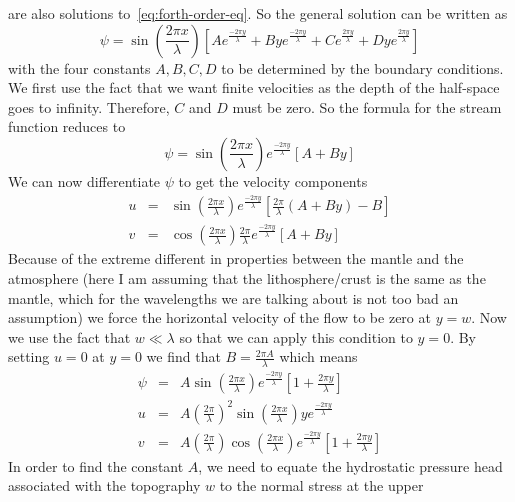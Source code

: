 \documentclass[12pt,twoside]{article}
\begin{document}
are also solutions to~\ref{eq:forth-order-eq}. So the general solution can be
written as
\begin{equation}
\psi = \sin \left (\frac{2 \pi x}{\lambda} \right ) \left [ A e^{\frac{-2 \pi
y}{\lambda}} + By e^{\frac{-2 \pi y}{\lambda}} + C e^{\frac{2 \pi y}{\lambda}}
+ Dy e^{\frac{2 \pi y}{\lambda}} \right ]
\end{equation}
with the four constants $A, B, C, D$ to be determined by the boundary
conditions.  We first use the fact that we want finite velocities as the depth
of the half-space goes to infinity.  Therefore, $C$ and $D$ must be zero.  So
the formula for the stream function reduces to
\begin{equation}
\psi = \sin \left (\frac{2 \pi x}{\lambda} \right ) 
e^{\frac{-2 \pi y}{\lambda}} \left [ A + By \right ]
\end{equation}
We can now differentiate $\psi$ to get the velocity components
\begin{eqnarray}
u & = & \sin \left (\frac{2 \pi x}{\lambda} \right )  
e^{\frac{-2\pi y}{\lambda}}\left [\frac{2\pi}{\lambda}(A + By)-B\right ] \\
v & = & \cos \left (\frac{2 \pi x}{\lambda} \right ) \frac{2 \pi}{\lambda}
e^{\frac{-2 \pi y}{\lambda}} \left [ A + By \right ]
\end{eqnarray}
Because of the extreme different in properties between the mantle and the
atmosphere (here I am assuming that the lithosphere/crust is the same as the
mantle, which for the wavelengths we are talking about is not too bad an
assumption) we force the horizontal velocity of the flow to be zero at $y =
w$.  Now we use the fact that $w \ll \lambda$ so that we can apply this
condition to $y=0$.  By setting $u=0$ at $y=0$ we find that $B = \frac{2\pi
A}{\lambda}$ which means
\begin{eqnarray} 
\psi & = & A \sin \left (\frac{2 \pi x}{\lambda} \right )  e^{\frac{-2 \pi
y}{\lambda}} \left [ 1 + \frac{2 \pi y}{\lambda} \right ] \\
u & = & A \left ( \frac{2\pi}{\lambda} \right )^2
\sin \left (\frac{2 \pi x}{\lambda} \right ) y e^{\frac{-2\pi y}{\lambda}} \\ 
v & = & A \left ( \frac{2 \pi}{\lambda} \right )
\cos \left (\frac{2 \pi x}{\lambda} \right ) e^{\frac{-2 \pi y}{\lambda}} 
\left [ 1 + \frac{2 \pi y}{\lambda} \right ]
\end{eqnarray}
In order to find the constant $A$, we need to equate the hydrostatic pressure
head associated with the topography $w$ to the normal stress at the upper
\end{document}
